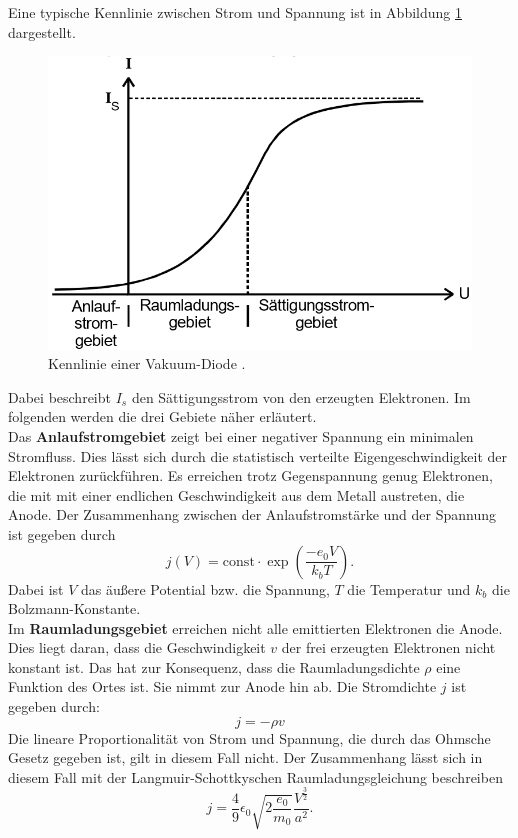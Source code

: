 Eine typische Kennlinie zwischen Strom und Spannung ist in Abbildung \ref{abb:3} dargestellt.
\begin{figure}[H]
  \centering
  \includegraphics[width=10 cm , height= 5 cm]{content/Kennlinie.png}
  \caption{Kennlinie einer Vakuum-Diode \cite{1}.}
  \label{abb:3}
\end{figure}
Dabei beschreibt $I_s$ den Sättigungsstrom von den erzeugten Elektronen.
Im folgenden werden die drei Gebiete näher erläutert.\\
Das \textbf{Anlaufstromgebiet} zeigt bei einer negativer Spannung ein minimalen Stromfluss. Dies lässt sich durch die
statistisch verteilte Eigengeschwindigkeit der Elektronen zurückführen. Es erreichen trotz Gegenspannung
genug Elektronen, die mit mit einer endlichen Geschwindigkeit aus dem Metall austreten, die Anode.
Der Zusammenhang zwischen der Anlaufstromstärke und der Spannung ist gegeben durch
\begin{equation}
  j(V) = \text{const} \cdot \exp\left(\frac{-e_0 V}{k_b T}\right).
  \label{eq:1}
\end{equation}
Dabei ist $V$ das äußere Potential bzw. die Spannung, $T$ die Temperatur und $k_b$ die Bolzmann-Konstante.\\
Im \textbf{Raumladungsgebiet} erreichen nicht alle emittierten Elektronen die Anode.
Dies liegt daran, dass die Geschwindigkeit $v$ der frei erzeugten Elektronen nicht konstant ist. Das hat zur
Konsequenz, dass die Raumladungsdichte $\rho$ eine Funktion des Ortes ist. Sie nimmt zur Anode hin ab.
Die Stromdichte $j$ ist gegeben durch:
\begin{equation*}
  j = -\rho v
\end{equation*}
Die lineare Proportionalität von Strom und Spannung, die durch das
Ohmsche Gesetz gegeben ist, gilt in diesem Fall nicht. Der Zusammenhang lässt sich in diesem Fall mit der Langmuir-Schottkyschen Raumladungsgleichung
beschreiben
\begin{equation}
  j = \frac{4}{9} \epsilon_0 \sqrt{2\frac{e_0}{m_0}} \frac{V^\frac{3}{2}}{a^2}.
  \label{eq:2}
\end{equation}
